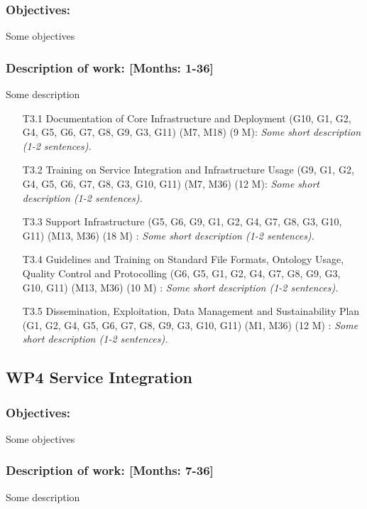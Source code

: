 \documentclass{report}
\begin{document}
\subsubsection{Objectives:} Some objectives
\subsubsection{Description of work: [Months: 1-36]} Some description

\begin{enumerate}
\item [T3.1] Documentation of Core Infrastructure and Deployment (G10, G1, G2, G4, G5, G6, G7, G8, G9, G3, G11) (M7, M18) (9 M): \emph{ Some short description (1-2 sentences).}
\item [T3.2] Training on Service Integration and Infrastructure Usage (G9, G1, G2, G4, G5, G6, G7, G8, G3, G10, G11) (M7, M36) (12 M): \emph{ Some short description (1-2 sentences).}
\item [T3.3] Support Infrastructure (G5, G6, G9, G1, G2, G4, G7, G8, G3, G10, G11) (M13, M36) (18 M) : \emph{ Some short description (1-2 sentences).}
\item [T3.4] Guidelines and Training on Standard File Formats, Ontology Usage, Quality Control and Protocolling (G6, G5, G1, G2, G4, G7, G8, G9, G3, G10, G11) (M13, M36) (10 M) : \emph{ Some short description (1-2 sentences).}
\item [T3.5] Dissemination, Exploitation, Data Management and Sustainability Plan (G1, G2, G4, G5, G6, G7, G8, G9, G3, G10, G11) (M1, M36) (12 M) : \emph{ Some short description (1-2 sentences).}
\end{enumerate}

\subsection*{WP4 Service Integration}

\subsubsection{Objectives:} Some objectives
\subsubsection{Description of work: [Months: 7-36]} Some description
\end{document}
